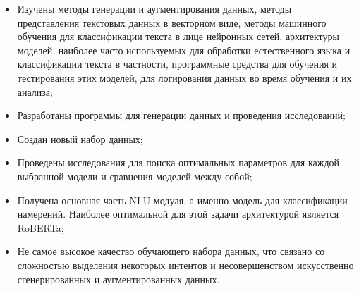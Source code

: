 \begin{itemize}
   \item Изучены методы генерации и аугментирования данных, методы представления текстовых данных в векторном виде, методы машинного обучения для классификации текста в лице нейронных сетей, архитектуры моделей, наиболее часто используемых для обработки естественного языка и классификации текста в частности, программные средства для обучения и тестирования этих моделей, для логирования данных во время обучения и их анализа;
   \item Разработаны программы для генерации данных и проведения исследований;
   \item Создан новый набор данных;
   \item Проведены исследования для поиска оптимальных параметров для каждой выбранной модели и сравнения моделей между собой;
   \item Получена основная часть NLU модуля, а именно модель для классификации намерений. Наиболее оптимальной для этой задачи архитектурой является RoBERTa;
   \item Не самое высокое качество обучающего набора данных, что связано со сложностью выделения некоторых интентов и несовершенством искусственно сгенерированных и аугментированных данных.
\end{itemize}


